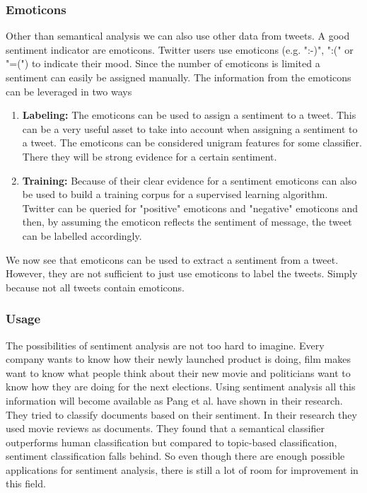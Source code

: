 \documentclass{article}
\begin{document}
\subsubsection*{Emoticons}
Other than semantical analysis we can also use other data from tweets. A good sentiment indicator are emoticons. Twitter users use emoticons (e.g. ":-)", ":(" or "=(") to indicate their mood.\cite{twitterSentiment} Since the number of emoticons is limited a sentiment can easily be assigned manually. The information from the emoticons can be leveraged in two ways
\begin{enumerate}
\item \textbf{Labeling:} The emoticons can be used to assign a sentiment to a tweet. This can be a very useful asset to take into account when assigning a sentiment to a tweet. The emoticons can be considered unigram features for some classifier. There they will be strong evidence for a certain sentiment.
\item \textbf{Training:} Because of their clear evidence for a sentiment emoticons can also be used to build a training corpus for a supervised learning algorithm. Twitter can be queried for "positive" emoticons and "negative" emoticons and then, by assuming the emoticon reflects the sentiment of message, the tweet can be labelled accordingly.\cite{moodLens} 
\end{enumerate}
We now see that emoticons can be used to extract a sentiment from a tweet. However, they are not sufficient to just use emoticons to label the tweets. Simply because not all tweets contain emoticons.
\subsubsection*{Usage}
The possibilities of sentiment analysis are not too hard to imagine. Every company wants to know how their newly launched product is doing, film makes want to know what people think about their new movie and politicians want to know how they are doing for the next elections. Using sentiment analysis all this information will become available as Pang et al. \cite{machineLearning} have shown in their research. They tried to classify documents based on their sentiment. In their research they used movie reviews as documents. They found that a semantical classifier outperforms human classification but compared to topic-based classification, sentiment classification falls behind. So even though there are enough possible applications for sentiment analysis, there is still a lot of room for improvement in this field.
\end{document}
